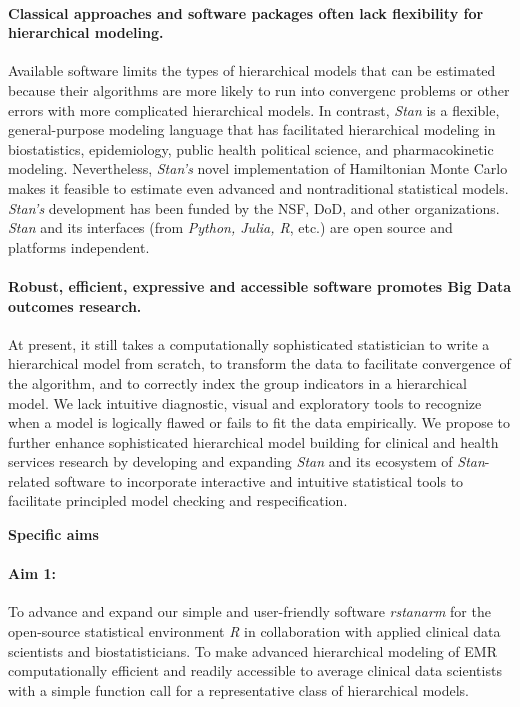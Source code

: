 \documentclass[11pt,notitlepage]{article}
\begin{document}
\paragraph*{Classical approaches and software packages often lack flexibility 
for hierarchical modeling.} Available software limits the types of 
hierarchical models that can be estimated because their algorithms are more likely 
to run into convergenc problems or other errors with more complicated hierarchical models.
In contrast, \textit{Stan} is a flexible, general-purpose modeling language that has 
facilitated hierarchical modeling in biostatistics, epidemiology, public health 
political science, and pharmacokinetic modeling. Nevertheless, \textit{Stan's} novel 
implementation of Hamiltonian Monte Carlo makes it feasible to estimate 
even advanced and nontraditional statistical models. \textit{Stan's} development has been funded 
by the NSF, DoD, and other organizations. \textit{Stan} and its interfaces (from \textit{Python, Julia, R}, etc.) 
are open source and platforms independent. 

\paragraph*{Robust, efficient, expressive and accessible software promotes Big 
Data outcomes research.} At present, it still takes a computationally 
sophisticated statistician to write a hierarchical model from scratch, to transform 
the data to facilitate convergence of the algorithm, and to correctly index the group 
indicators in a hierarchical model. We lack intuitive diagnostic, visual and exploratory 
tools to recognize when a model is logically flawed or fails to fit the data empirically. 
We propose to further enhance sophisticated hierarchical model 
building for clinical and health services research by developing and expanding 
\textit{Stan} and its ecosystem of \textit{Stan}-related software to 
incorporate interactive and intuitive statistical tools to facilitate principled model 
checking and respecification.

\noindent \textbf{Specific aims}
\paragraph*{Aim 1:} To advance and expand our simple and user-friendly software 
\textit{rstanarm} for the open-source statistical environment \textit{R} 
in collaboration with applied clinical data scientists and biostatisticians. To 
make advanced hierarchical modeling of EMR computationally efficient and readily 
accessible to average clinical data scientists with a simple function call for a 
representative class of hierarchical models.
\end{document}
